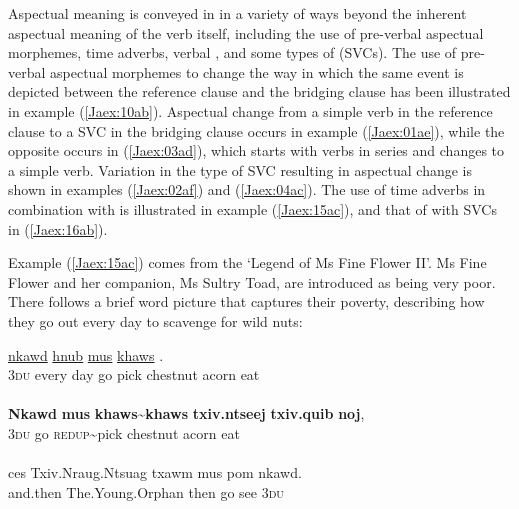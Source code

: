 \documentclass[output=paper]{LSP/langsci}
\begin{document}
Aspectual meaning is conveyed in  in a variety of ways beyond the inherent aspectual meaning of the verb itself, including the use of pre-verbal aspectual morphemes, time adverbs, verbal , and some types of  (SVCs). The use of pre-verbal aspectual morphemes to change the way in which the same event is depicted between the reference clause and the bridging clause has been illustrated in example (\ref{Jaex:10ab}). Aspectual change from a simple verb in the reference clause to a SVC in the bridging clause occurs in example (\ref{Jaex:01ae}), while the opposite occurs in (\ref{Jaex:03ad}), which starts with verbs in series and changes to a simple verb. Variation in the type of SVC resulting in aspectual change is shown in examples (\ref{Jaex:02af}) and (\ref{Jaex:04ac}). The use of time adverbs in combination with  is illustrated in example (\ref{Jaex:15ac}), and that of  with SVCs in (\ref{Jaex:16ab}). 

Example (\ref{Jaex:15ac}) comes from the `Legend of Ms Fine Flower II'. Ms Fine Flower and her companion, Ms Sultry Toad, are introduced as being very poor. There follows a brief word picture that captures their poverty, describing how they go out every day to scavenge for wild nuts:


\begin{exe}
\ex \label{Jaex:15ac}
\begin{xlist}
\ex \label{Jaex:15a}
\gll  \underline{nkawd} \underline{} \underline{hnub} \underline{mus} \underline{khaws} \underline{}     \underline{} \underline{}.\\
 \textsc{3du} every day go pick chestnut  acorn eat\\
\glt {}\\
\ex \label{Jaex:15b}
\gll \textbf{Nkawd} \textbf{mus}  \textbf{khaws{\textasciitilde}khaws} \textbf{txiv.ntseej} \textbf{txiv.quib } \textbf{noj}, \\     	      
     \textsc{3du}  go  \textsc{redup}{\textasciitilde}pick   chestnut  acorn  eat\\
\glt {} \\
\ex \label{Jaex:15c}
\gll ces Txiv.Nraug.Ntsuag txawm mus pom nkawd.\\     	      
     and.then The.Young.Orphan then go see \textsc{3du}\\
\glt {} \citep[][161]{johnson92}
\end{xlist}
\end{exe}
\end{document}
